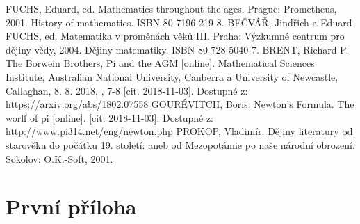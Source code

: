 \documentclass[rocnikovka]{gzwroc} %
\begin{document}
\begin{oldthebibliography}{99}
FUCHS, Eduard, ed. Mathematics throughout the ages. Prague: Prometheus, 2001. History of mathematics. ISBN 80-7196-219-8.
BEČVÁŘ, Jindřich a Eduard FUCHS, ed. Matematika v proměnách věků III. Praha: Výzkumné centrum pro dějiny vědy, 2004. Dějiny matematiky. ISBN 80-728-5040-7.
BRENT, Richard P. The Borwein Brothers, Pi and the AGM [online]. Mathematical Sciences Institute, Australian National University, Canberra a University of Newcastle, Callaghan, 8. 8. 2018, , 7-8 [cit. 2018-11-03]. Dostupné z: https://arxiv.org/abs/1802.07558
GOURÉVITCH, Boris. Newton's Formula. The worlf of pi [online]. [cit. 2018-11-03]. Dostupné z: http://www.pi314.net/eng/newton.php
PROKOP, Vladimír. Dějiny literatury od starověku do počátku 19. století: aneb od Mezopotámie po naše národní obrození. Sokolov: O.K.-Soft, 2001.
\end{oldthebibliography}
\newpage
\listoffigures
\listoftables
\newpage
\prilohy
\section{První příloha} %
\end{document}
